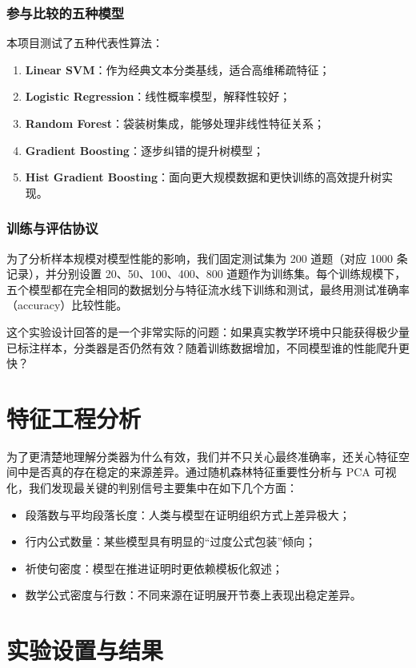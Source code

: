 \documentclass[11pt, a4paper]{ctexart}
\begin{document}
\subsubsection{参与比较的五种模型}
本项目测试了五种代表性算法：
\begin{enumerate}
    \item \textbf{Linear SVM}：作为经典文本分类基线，适合高维稀疏特征；
    \item \textbf{Logistic Regression}：线性概率模型，解释性较好；
    \item \textbf{Random Forest}：袋装树集成，能够处理非线性特征关系；
    \item \textbf{Gradient Boosting}：逐步纠错的提升树模型；
    \item \textbf{Hist Gradient Boosting}：面向更大规模数据和更快训练的高效提升树实现。
\end{enumerate}

\subsubsection{训练与评估协议}
为了分析样本规模对模型性能的影响，我们固定测试集为 200 道题（对应 1000 条记录），并分别设置 20、50、100、400、800 道题作为训练集。每个训练规模下，五个模型都在完全相同的数据划分与特征流水线下训练和测试，最终用测试准确率（accuracy）比较性能。

这个实验设计回答的是一个非常实际的问题：如果真实教学环境中只能获得极少量已标注样本，分类器是否仍然有效？随着训练数据增加，不同模型谁的性能爬升更快？

\section{特征工程分析}
为了更清楚地理解分类器为什么有效，我们并不只关心最终准确率，还关心特征空间中是否真的存在稳定的来源差异。通过随机森林特征重要性分析与 PCA 可视化，我们发现最关键的判别信号主要集中在如下几个方面：
\begin{itemize}
    \item 段落数与平均段落长度：人类与模型在证明组织方式上差异极大；
    \item 行内公式数量：某些模型具有明显的“过度公式包装”倾向；
    \item 祈使句密度：模型在推进证明时更依赖模板化叙述；
    \item 数学公式密度与行数：不同来源在证明展开节奏上表现出稳定差异。
\end{itemize}

\section{实验设置与结果}
\end{document}
